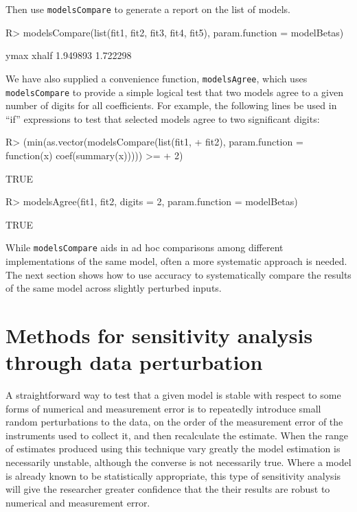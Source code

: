 \documentclass[11pt]{article}
\let\code=\texttt
\newcommand{\pkg}[1]{{\normalfont\fontseries{b}\selectfont #1}}
\begin{document}
Then use \code{modelsCompare} to generate a report on the list of models.

\begin{Schunk}
\begin{Sinput}
R> modelsCompare(list(fit1, fit2, fit3, fit4, fit5), param.function = modelBetas)
\end{Sinput}
\begin{Soutput}
    ymax    xhalf 
1.949893 1.722298 
\end{Soutput}
\end{Schunk}


We have also supplied a convenience function, \code{modelsAgree}, which uses \code{modelsCompare} to provide a simple logical test that two models agree
to a given number of digits for all coefficients. For example, the following lines
 be used in ``if'' expressions to test that selected models agree to two 
 significant digits:                                 

\begin{Schunk}
\begin{Sinput}
R> (min(as.vector(modelsCompare(list(fit1, 
+     fit2), param.function = function(x) coef(summary(x))))) >= 
+     2)
\end{Sinput}
\begin{Soutput}
[1] TRUE
\end{Soutput}
\begin{Sinput}
R> modelsAgree(fit1, fit2, digits = 2, param.function = modelBetas)
\end{Sinput}
\begin{Soutput}
[1] TRUE
\end{Soutput}
\end{Schunk}

While \code{modelsCompare} aids in ad hoc comparisons among different implementations of the same model, often a more systematic approach is needed. The next section shows how to use \pkg{accuracy} to systematically compare the results of the same model across slightly perturbed inputs. 

\section{Methods for sensitivity analysis through data perturbation}

A straightforward way to test that a given model is stable with respect to
some forms of numerical and measurement error is 
to repeatedly introduce small random perturbations to the data, on the order of the measurement error of the instruments used to collect it, and then recalculate the estimate. When the range of estimates produced using 
this technique vary greatly the model estimation is necessarily unstable, although
the converse is not necessarily true. Where a model is already known to be statistically appropriate,
this type of sensitivity analysis will give the researcher greater confidence that the their 
results are robust to numerical and measurement error.
\end{document}
